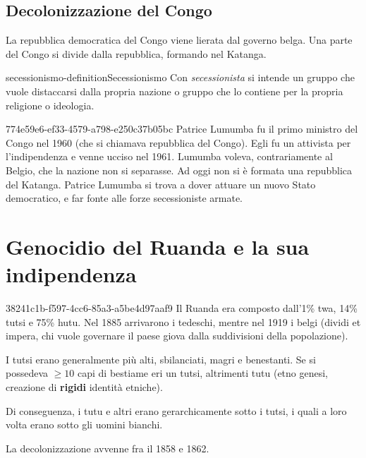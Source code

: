 \documentclass[preview]{standalone}
\begin{document}
\subsection{Decolonizzazione del Congo}

\begin{plainhtml}
    La repubblica democratica del Congo viene lierata dal governo belga.
    Una parte del Congo si divide dalla repubblica, formando nel Katanga.
\end{plainhtml}

\begin{snippetdefinition}{secessionismo-definition}{Secessionismo}
    Con \textit{secessionista} si intende un gruppo che vuole distaccarsi
    dalla propria nazione o gruppo che lo contiene per la propria religione o ideologia.
\end{snippetdefinition}

\begin{snippet}{774e59e6-ef33-4579-a798-e250c37b05bc}
    Patrice Lumumba fu il primo ministro del Congo nel 1960 (che si chiamava repubblica del Congo).
    Egli fu un attivista per l'indipendenza e venne ucciso nel 1961.
    Lumumba voleva, contrariamente al Belgio, che la nazione non si separasse.
    Ad oggi non si è formata una repubblica del Katanga.
    Patrice Lumumba si trova a dover attuare un nuovo Stato democratico,
    e far fonte alle forze secessioniste armate.
    
    
\end{snippet}

\section{Genocidio del Ruanda e la sua indipendenza}

\begin{snippet}{38241c1b-f597-4cc6-85a3-a5be4d97aaf9}
    Il Ruanda era composto dall'1\% twa, 14\% tutsi e 75\% hutu.
    Nel 1885 arrivarono i tedeschi, mentre nel 1919 i belgi (dividi et impera, chi vuole governare
    il paese giova dalla suddivisioni della popolazione).
    
    I tutsi erano generalmente più alti, sbilanciati, magri e benestanti.
    Se si possedeva \(\geq 10\) capi di bestiame eri un tutsi, altrimenti tutu (etno genesi,
    creazione di \textbf{rigidi} identità etniche).
    
    Di conseguenza, i tutu e altri erano gerarchicamente sotto i tutsi, i quali a loro volta
    erano sotto gli uomini bianchi.
    
    La decolonizzazione avvenne fra il 1858 e 1862.
    
\end{snippet}
\end{document}
